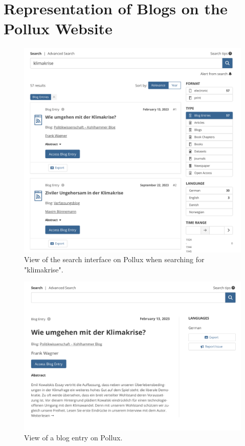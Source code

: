 \documentclass{article}
\begin{document}
\appendix
\section{Representation of Blogs on the Pollux Website}\label{appendix:website}

\begin{figure}[ht]
    \includegraphics[width=\textwidth]{figures/pollux_web_search_bar.png}
    \caption{View of the search interface on Pollux when searching for "klimakrise".}
    \label{fig:pollux_web_search_bar}
\end{figure}

\begin{figure}[ht]
    \includegraphics[width=\textwidth]{figures/pollux_web_blog_entry.png}
    \caption{View of a blog entry on Pollux.}
    \label{fig:pollux_web_blog_entry}
\end{figure}
\end{document}

